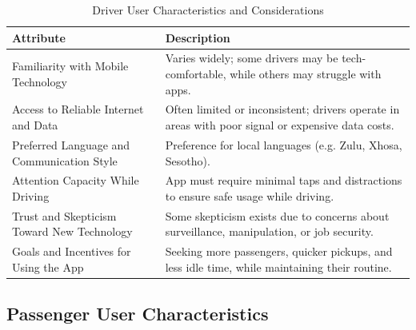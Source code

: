 \documentclass[a4paper,12pt]{article}
\begin{document}
\begin{table}[H]
\centering
\begin{tabular}{|p{5cm}|p{10cm}|}
\hline
\textbf{Attribute} & \textbf{Description} \\
\hline
Familiarity with Mobile Technology & Varies widely; some drivers may be tech-comfortable, while others may struggle with apps. \\
\hline
Access to Reliable Internet and Data & Often limited or inconsistent; drivers operate in areas with poor signal or expensive data costs. \\
\hline
Preferred Language and Communication Style & Preference for local languages (e.g. Zulu, Xhosa, Sesotho). \\
\hline
Attention Capacity While Driving & App must require minimal taps and distractions to ensure safe usage while driving. \\
\hline
Trust and Skepticism Toward New Technology & Some skepticism exists due to concerns about surveillance, manipulation, or job security. \\
\hline
Goals and Incentives for Using the App & Seeking more passengers, quicker pickups, and less idle time, while maintaining their routine. \\
\hline
\end{tabular}
\caption{Driver User Characteristics and Considerations}
\label{tab:driver-characteristics}
\end{table}

\subsection{Passenger User Characteristics}
\end{document}
